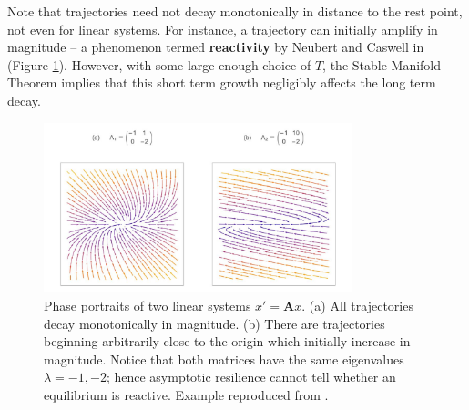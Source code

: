 
\begin{remark}
	Note that trajectories need not decay monotonically in distance to the rest point, not even for linear systems. For instance, a trajectory can initially amplify in magnitude -- a phenomenon termed \textbf{reactivity} by Neubert and Caswell in \cite{neubertAlternativesResilienceMeasuring1997a} (Figure \ref{fig:reactivity}). However, with some large enough choice of $T$, the Stable Manifold Theorem implies that this short term growth negligibly affects the long term decay. 
\end{remark}

\begin{figure}[ht]
	\centering
	\captionsetup{width=0.8\linewidth}
	\includegraphics[width=0.8\textwidth]{figs/positive_reactivity_real_example}
	\caption{Phase portraits of two linear systems $x' = \textbf{A}x$. (a) All trajectories decay monotonically in magnitude. (b) There are trajectories beginning arbitrarily close to the origin which initially increase in magnitude. Notice that both matrices have the same eigenvalues $\lambda = -1, -2$; hence asymptotic resilience cannot tell whether an equilibrium is reactive. Example reproduced from \cite{neubertAlternativesResilienceMeasuring1997a}.}
	
	\label{fig:reactivity}
\end{figure} 